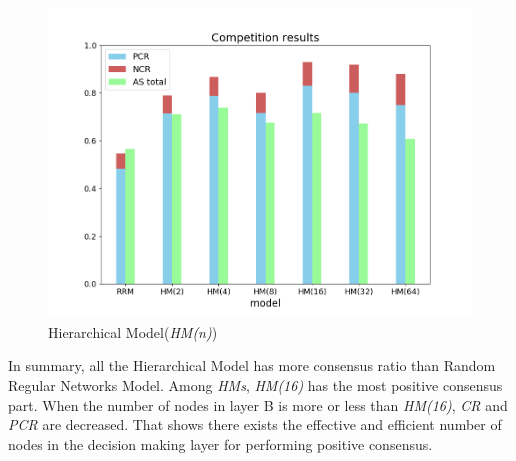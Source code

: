 \documentclass[english]{cccconf}
\begin{document}
\begin{figure}[!htb]
	\centering
	\includegraphics[width=\hsize]{FIG4.png}
	\caption{Hierarchical Model(\textit{HM(n)})}
	\label{Fig4}
\end{figure}

In summary, all the Hierarchical Model has more consensus ratio than Random Regular Networks Model. Among \textit{HMs}, \textit{HM(16)} has the most positive consensus part. When the number of nodes in layer B is more or less than \textit{HM(16)}, \textit{CR} and \textit{PCR} are decreased. That shows there exists the effective and efficient number of nodes in the decision making layer for performing positive consensus.  
\end{document}
